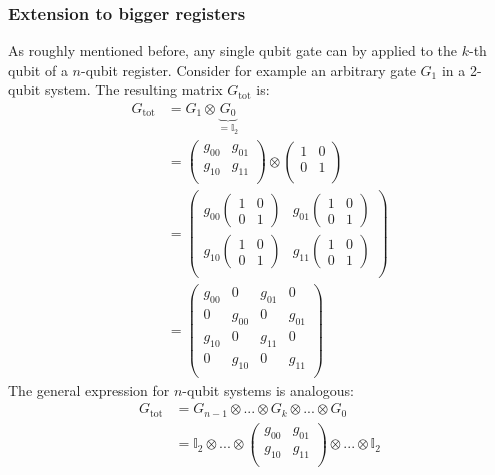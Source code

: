 \documentclass[bibliography=totocnumbered]{article}
\theoremstyle{NoticeStyle}
\begin{document}
\subsubsection{Extension to bigger registers}
As roughly mentioned before, any single qubit gate can by applied to the $k$-th qubit of a $n$-qubit register. Consider for example an arbitrary gate $G_1$ in a 2-qubit system. The resulting matrix $G_\text{tot}$ is:
%
\begin{align}
	G_\text{tot} 
	&= G_1 \otimes \underbrace{G_0}_{=\mathbb{I}_2}\\
	&=
	\begin{pmatrix}
		g_{00} & g_{01}\\
		g_{10} & g_{11}\\
	\end{pmatrix}
	\otimes
	\begin{pmatrix}
		1 & 0\\
		0 & 1\\
	\end{pmatrix}\\
	&=
	\begin{pmatrix}
		g_{00} \left(\begin{smallmatrix}1& 0\\ 0& 1\end{smallmatrix}\right) & g_{01} \left(\begin{smallmatrix}1& 0\\ 0& 1\end{smallmatrix}\right)\\
		g_{10} \left(\begin{smallmatrix}1& 0\\ 0& 1\end{smallmatrix}\right) & g_{11} \left(\begin{smallmatrix}1& 0\\ 0& 1\end{smallmatrix}\right)\\
	\end{pmatrix}
	\\
	&=
	\begin{pmatrix}
		g_{00} & 0 & g_{01} & 0\\
		0 & g_{00} & 0 & g_{01}\\
		g_{10} & 0 & g_{11} & 0\\
		0 & g_{10} & 0 & g_{11}\\
	\end{pmatrix}
\end{align}
%
%
The general expression for $n$-qubit systems is analogous:
%
\begin{align}
	G_\text{tot} 
	&= G_{n-1} \otimes ... \otimes G_k \otimes ...\otimes G_0\\
	&= \mathbb{I}_2 \otimes ... \otimes
	\left(
	\begin{smallmatrix}
		g_{00} & g_{01}\\
		g_{10} & g_{11}\\
	\end{smallmatrix}
	\right)
	\otimes ...\otimes \mathbb{I}_2
\end{align}
%
\end{document}
